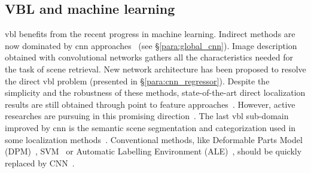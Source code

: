 	\subsection{VBL and machine learning} 
    	\ac{vbl} benefits from the recent progress in machine learning. Indirect methods are now dominated by \ac{cnn} approaches~\citep{Radenovic2016,Gordo2016} (see \S\ref{para:global_cnn}). Image description obtained with convolutional networks gathers all the characteristics needed for the task of scene retrieval. New network architecture has been proposed to resolve the direct \ac{vbl} problem (presented in \S\ref{para:cnn_regressor}). Despite the simplicity and the robustness of these methods, state-of-the-art direct localization results are still obtained through point to feature approaches~\citep{Walch2016a}. However, active researches are pursuing in this promising direction~\citep{Liu2016,Jia2016,Kendall2017}. The last \ac{vbl} sub-domain improved by \ac{cnn} is the semantic scene segmentation and categorization used in some localization methods~\citep{Salas-Moreno2013,Ardeshir2014,Arth2015,Christie2016}. Conventional methods, like Deformable Parts Model (DPM)~\citep{Ardeshir2014}, SVM~\citep{Arth2015} or Automatic Labelling Environment (ALE)~\citep{Christie2016}, should be quickly replaced by CNN~\citep{Sunderhauf2015a,Zhao2016}.